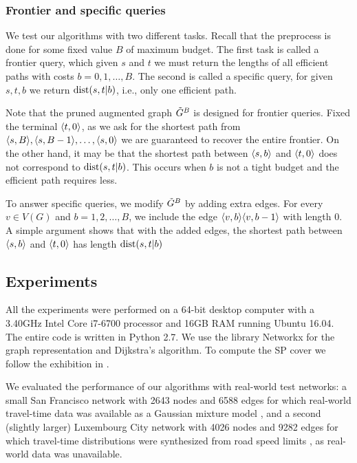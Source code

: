\subsubsection{Frontier and specific queries}

We test our algorithms with two different tasks.
Recall that the preprocess is done for some fixed value $B$ of maximum budget.
The first task is called a frontier query, which given $s$ and $t$ we must return the lengths of all efficient paths with costs $b=0,1,\ldots,B$.
The second is called a specific query, for given $s,t,b$ we return $\text{dist}(s,t|b)$, i.e., only one efficient path.

Note that the pruned augmented graph $\tilde G^B$ is designed for frontier queries.
Fixed the terminal $\langle t,0\rangle$, as we ask for the shortest path from $\langle s,B\rangle,\langle s,B-1\rangle,\ldots,\langle s,0\rangle$ we are guaranteed to recover the entire frontier.
On the other hand, it may be that the shortest path between $\langle s,b\rangle$ and $\langle t,0\rangle$ does not correspond to $\text{dist}(s,t|b)$.
This occurs when $b$ is not a tight budget and the efficient path requires less.

To answer specific queries, we modify $\tilde G^B$ by adding extra edges.
For every $v\in V(G)$ and $b=1,2,\ldots,B$, we include the edge $\langle v,b\rangle\langle v,b-1\rangle$ with length $0$.
A simple argument shows that with the added edges, the shortest path between $\langle s,b\rangle$ and $\langle t,0\rangle$ has length $\text{dist}(s,t|b)$

\subsection{Experiments}

All the experiments were performed on a 64-bit desktop computer with a 3.40GHz Intel Core i7-6700 processor and 16GB RAM running Ubuntu 16.04.
The entire code is written in Python 2.7. We use the library Networkx for the graph representation and Dijkstra's algorithm.
To compute the SP cover we follow the exhibition in \cite{hubimplem}.

We evaluated the performance of our algorithms with real-world test networks: a small San Francisco network with 2643 nodes and 6588 edges for which real-world travel-time data was available as a Gaussian mixture model \cite{sf_data}, and a second (slightly larger) Luxembourg City network with 4026 nodes and 9282 edges for which travel-time distributions were synthesized from road speed limits \cite{niknami2016tractable}, as real-world data was unavailable.
 
